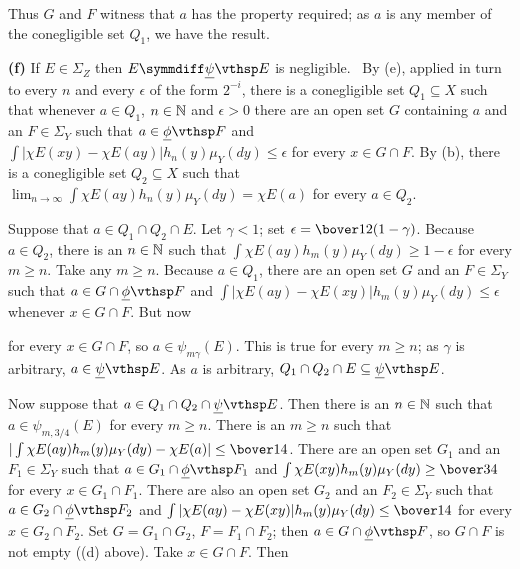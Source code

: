 {\noindent Thus $G$ and $F$ witness that $a$ has the property required;
as $a$ is any member of the conegligible set $Q_1$, we have the
result.\ \Qed

\medskip

{\bf (f)} If $E\in\Sigma_Z$ then
$E\symmdiff\undpsi E$ is negligible.   \Prf\ By (e), applied in turn to
every $n$ and every $\epsilon$ of the form $2^{-i}$, there is a
conegligible set $Q_1\subseteq X$ such that whenever $a\in Q_1$,
$n\in\Bbb N$ and $\epsilon>0$ there are an open set $G$ containing $a$
and an $F\in\Sigma_Y$ such that $a\in\undphi F$ and
$\int|\chi E(xy)-\chi E(ay)|h_n(y)\mu_Y(dy)\le\epsilon$ for every
$x\in G\cap F$.   By (b), there is a conegligible set $Q_2\subseteq X$
such that $\lim_{n\to\infty}\int\chi E(ay)h_n(y)\mu_Y(dy)=\chi E(a)$ for
every $a\in Q_2$.

Suppose that $a\in Q_1\cap Q_2\cap E$.   Let $\gamma<1$;  set
$\epsilon=\bover12(1-\gamma)$.   Because $a\in Q_2$, there is an
$n\in\Bbb N$ such that
$\int\chi E(ay)h_m(y)\mu_Y(dy)\ge 1-\epsilon$ for every $m\ge n$.   Take
any $m\ge n$.   Because $a\in Q_1$, there are an open set $G$ and an
$F\in\Sigma_Y$ such that $a\in G\cap\undphi F$ and
$\int|\chi E(ay)-\chi E(xy)|h_m(y)\mu_Y(dy)\le\epsilon$ whenever
$x\in G\cap F$.   But now


\noindent for every $x\in G\cap F$, so $a\in\psi_{m\gamma}(E)$.   This
is true for every $m\ge n$;  as $\gamma$ is arbitrary, $a\in\undpsi E$.
As $a$ is arbitrary, $Q_1\cap Q_2\cap E\subseteq\undpsi E$.

Now suppose that $a\in Q_1\cap Q_2\cap\undpsi E$.   Then there is an
$n\in\Bbb N$ such that $a\in\psi_{m,3/4}(E)$ for every $m\ge n$.   There
is an $m\ge n$ such that $|\int\chi E(ay)h_m(y)\mu_Y(dy)-\chi
E(a)|\le\bover14$.   There are an open set $G_1$ and an $F_1\in\Sigma_Y$
such that $a\in G_1\cap\undphi F_1$ and
$\int\chi E(xy)h_m(y)\mu_Y(dy)\ge\bover34$ for every $x\in G_1\cap F_1$.   There are also an open set $G_2$ and an $F_2\in\Sigma_Y$ such that
$a\in G_2\cap\undphi F_2$ and
$\int|\chi E(ay)-\chi E(xy)|h_m(y)\mu_Y(dy)\le\bover14$ for every
$x\in G_2\cap F_2$.   Set
$G=G_1\cap G_2$, $F=F_1\cap F_2$;  then $a\in G\cap\undphi F$, so $G\cap
F$ is not empty ((d) above).   Take $x\in G\cap F$.   Then



}
